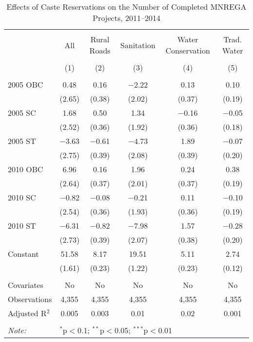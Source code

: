 \begin{table}[!htbp]
\centering
\begin{threeparttable}

  \caption{Effects of Caste Reservations on the Number of Completed MNREGA Projects, 2011--2014} 
  \label{main_caste_mnrega} 
\scriptsize 
\begin{tabular}{@{\extracolsep{0pt}}lccccc} 
\\[-1.8ex]\hline 
\hline \\[-1.8ex] 
 & All & Rural Roads & Sanitation & Water Conservation & Trad. Water \\ 
\\[-1.8ex] & (1) & (2) & (3) & (4) & (5)\\ 
\hline \\[-1.8ex] 
 2005 OBC & 0.48 & 0.16 & $-$2.22 & 0.13 & 0.10 \\ 
  & (2.65) & (0.38) & (2.02) & (0.37) & (0.19) \\ 
  2005 SC & 1.68 & 0.50 & 1.34 & $-$0.16 & $-$0.05 \\ 
  & (2.52) & (0.36) & (1.92) & (0.36) & (0.18) \\ 
  2005 ST & $-$3.63 & $-$0.61 & $-$4.73 & 1.89 & $-$0.07 \\ 
  & (2.75) & (0.39) & (2.08) & (0.39) & (0.20) \\ 
  2010 OBC & 6.96 & 0.16 & 1.96 & 0.24 & 0.38 \\ 
  & (2.64) & (0.37) & (2.01) & (0.37) & (0.19) \\ 
  2010 SC & $-$0.82 & $-$0.08 & $-$0.21 & 0.11 & $-$0.10 \\ 
  & (2.54) & (0.36) & (1.93) & (0.36) & (0.19) \\ 
  2010 ST & $-$6.31 & $-$0.82 & $-$7.98 & 1.57 & $-$0.28 \\ 
  & (2.73) & (0.39) & (2.07) & (0.38) & (0.20) \\ 
  Constant & 51.58 & 8.17 & 19.51 & 5.11 & 2.74 \\ 
  & (1.61) & (0.23) & (1.22) & (0.23) & (0.12) \\ 
 \hline \\[-1.8ex] 
Covariates & No & No & No & No & No \\ 
Observations & 4,355 & 4,355 & 4,355 & 4,355 & 4,355 \\ 
Adjusted R$^{2}$ & 0.005 & 0.003 & 0.01 & 0.02 & 0.001 \\ 
\hline 
\hline \\[-1.8ex] 
\textit{Note:}  & \multicolumn{5}{l}{$^{*}$p$<$0.1; $^{**}$p$<$0.05; $^{***}$p$<$0.01} \\ 

\end{tabular}
\end{threeparttable}
\end{table}
